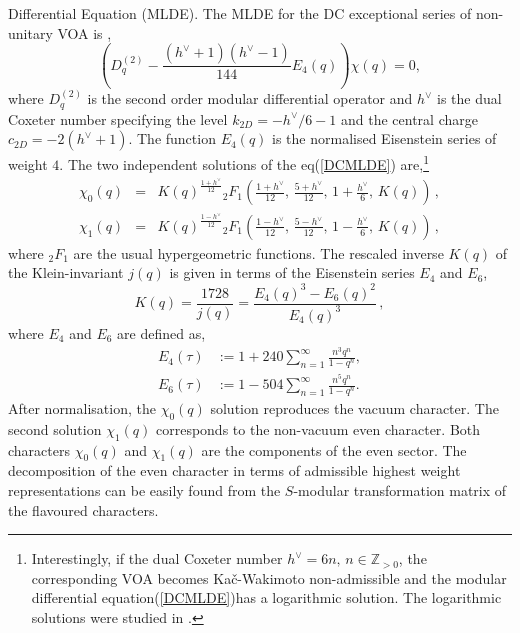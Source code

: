 \documentclass[a4paper,12pt]{article}
\begin{document}
Differential Equation (MLDE). The MLDE for the DC exceptional series of non-unitary VOA is \cite{Kaneko:2013uga, Arakawa:2016hkg, Beem:2017ooy},
%
\begin{equation}\label{DCMLDE}
  \left(D_q^{(2)}-\frac{(h^{\vee}+1)(h^{\vee}-1)}{144}E_4(q)\right)\chi(q)=0,
\end{equation}
%
where $D_q^{(2)}$ is the second order modular differential operator and
$h^\vee$ is the dual Coxeter number specifying the level $k_{2D}=-h^{\vee}/6-1$ and the central charge $c_{2D}=-2(h^\vee+1)$. The function $E_4(q)$ is the normalised Eisenstein series of weight $4$. The two independent solutions of the eq(\ref{DCMLDE}) are,\footnote{Interestingly, if the dual Coxeter number $h^{\vee}=6n,\, n\in\mathbb{Z}_{>0}$, the corresponding VOA becomes Ka\v c-Wakimoto non-admissible and the modular differential equation(\ref{DCMLDE})has a logarithmic solution. The logarithmic solutions were studied in \cite{Kaneko:2013uga}.}
%
\begin{eqnarray}\label{non_uni_ch}
\chi_0(q) & = & K(q)^{\frac{1+h^{\vee}}{12}}{}_2 F_1\left(\frac{1+h^{\vee}}{12},\,\frac{5+h^{\vee}}{12},\,1+\frac{h^{\vee}}{6},\,K(q)\right)\, ,\nonumber\\
\chi_1(q) & = & K(q)^{\frac{1-h^{\vee}}{12}}{}_2 F_1\left(\frac{1-h^{\vee}}{12},\,\frac{5-h^{\vee}}{12},\,1-\frac{h^{\vee}}{6},\,K(q)\right)\, ,
\end{eqnarray}
%
where $_2F_1$ are the usual hypergeometric functions. The rescaled inverse $K(q)$ of the Klein-invariant $j(q)$ is given in terms of the Eisenstein series $E_4$ and $E_6$,
%
\begin{equation}
    K(q)=\frac{1728}{j(q)}=\frac{E_4(q)^3-E_6(q)^2}{E_4(q)^3}\, ,
\end{equation}
where $E_4$ and $E_6$ are defined as,
\begin{align}
E_4(\tau) &:= 1+240 \sum_{n=1}^{\infty}\frac{n^3q^n}{1-q^n},\nonumber\\
E_6(\tau) &:= 1-504 \sum_{n=1}^{\infty}\frac{n^5q^n}{1-q^n}.
\end{align}
% 
After normalisation, the $\chi_0(q)$ solution reproduces the vacuum character. The second solution $\chi_1(q)$ corresponds to the non-vacuum even character. Both characters $\chi_0(q)$ and $\chi_1(q)$ are the components of the even sector. The decomposition of the even character in terms of admissible highest weight representations can be easily found from the $S$-modular transformation matrix of the flavoured characters. 
\end{document}
